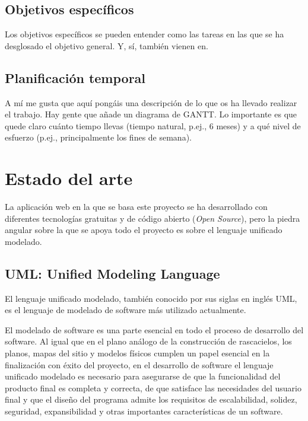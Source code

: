 \documentclass[a4paper, 12pt]{book}
\begin{document}
\section{Objetivos específicos}
\label{sec:objetivos-especificos}

Los objetivos específicos se pueden entender como las tareas en las que se ha desglosado el objetivo general.
Y, sí, también vienen en.


\section{Planificación temporal}
\label{sec:planificacion-temporal}

A mí me gusta que aquí pongáis una descripción de lo que os ha llevado realizar el trabajo.
Hay gente que añade un diagrama de GANTT.
Lo importante es que quede claro cuánto tiempo llevas (tiempo natural, p.ej., 6 meses) y a qué nivel de esfuerzo (p.ej., principalmente los fines de semana).



\cleardoublepage
\chapter{Estado del arte}
\label{chap:estado}


La aplicación web en la que se basa este proyecto se ha desarrollado con diferentes tecnologías gratuitas y de código abierto (\emph{Open Source}), pero la piedra angular sobre la que se apoya todo el proyecto es sobre el lenguaje unificado modelado. 


\section{UML: Unified Modeling Language} 
\label{sec:seccion1}

El lenguaje unificado modelado, también conocido por sus siglas en inglés UML, es el lenguaje de modelado de software más utilizado actualmente. 

El modelado de software es una parte esencial en todo el proceso de desarrollo del software. Al igual que en el plano análogo de la construcción de rascacielos, los planos, mapas del sitio y modelos físicos cumplen un papel esencial en la finalización con éxito del proyecto, en el desarrollo de software el lenguaje unificado modelado es necesario para asegurarse de que la funcionalidad del producto final es completa y correcta, de que satisface las necesidades del usuario final y que el diseño del programa admite los requisitos de escalabilidad, solidez, seguridad, expansibilidad y otras importantes características de un software. 
\end{document}
